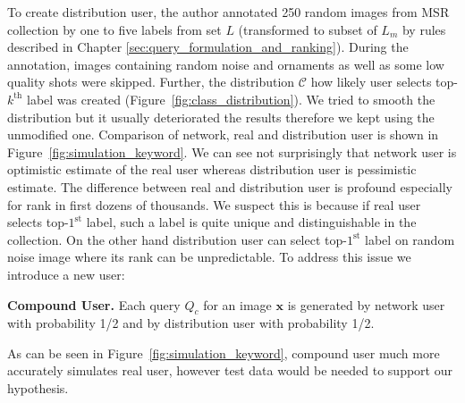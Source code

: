 To create distribution user, the author annotated 250 random images from MSR collection by one to five labels from set $L$ (transformed to subset of $L_m$ by rules described in Chapter \ref{sec:query_formulation_and_ranking}). During the annotation, images containing random noise and ornaments as well as some low quality shots were skipped. Further, the distribution $\mathcal{C}$ how likely user selects top-$k^{\mathrm{th}}$ label was created (Figure~\ref{fig:class_distribution}). We tried to smooth the distribution but it usually deteriorated the results therefore we kept using the unmodified one. Comparison of network, real and distribution user is shown in Figure~\ref{fig:simulation_keyword}. We can see not surprisingly that network user is optimistic estimate of the real user whereas distribution user is pessimistic estimate. The difference between real and distribution user is profound especially for rank in first dozens of thousands. We suspect this is because if real user selects top-$1^{\mathrm{st}}$ label, such a label is quite unique and distinguishable in the collection. On the other hand distribution user can select top-$1^{\mathrm{st}}$ label on random noise image where its rank can be unpredictable. To address this issue we introduce a new user:
\begin{description}[labelwidth=1em, leftmargin=!]
	\item \textbf{Compound User.} Each query $Q_c$ for an image $\bm{x}$ is generated by network user with probability 1/2 and by distribution user with probability 1/2.
\end{description}
As can be seen in Figure~\ref{fig:simulation_keyword}, compound user much more accurately simulates real user, however test data would be needed to support our hypothesis. 

